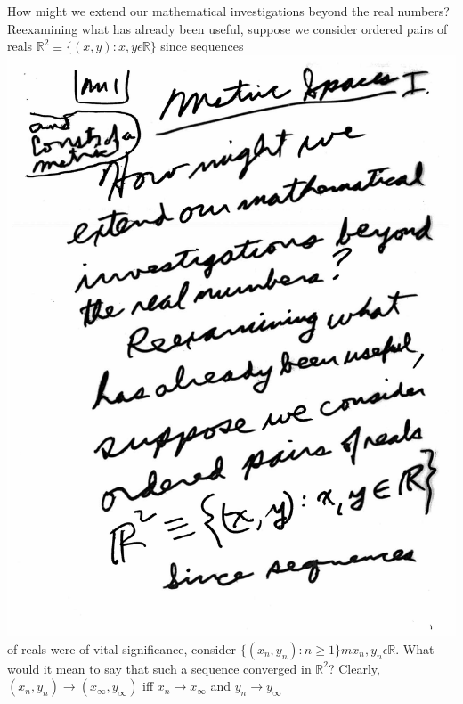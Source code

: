 \documentclass[10pt,a4paper]{article}
\begin{document}
{{%
How might we extend our mathematical investigations beyond the real numbers?
\\Reexamining what has already been useful, suppose we consider ordered pairs of reals $\mathbb{R}^{2}\equiv \lbrace (x,y):x,y\epsilon \mathbb{R}\rbrace$ since sequences
\\\includegraphics[scale=0.5]{Pages/MetricSpace1_1.pdf}
\pagebreak
\\of reals were of vital significance, consider $\lbrace (x_{n} ,y_{n} ):n\geq 1\rbrace mx_{n} ,y_{n} \epsilon \mathbb{R}$. What would it mean to say that such a sequence converged in $\mathbb{R} ^{2}$? Clearly, $(x_{n} ,y_{n} )\rightarrow (x_{\infty} ,y_{\infty})$ iff $x_{n} \rightarrow x_{\infty}$ and $y_{n} \rightarrow y_{\infty}$
}}
\end{document}
